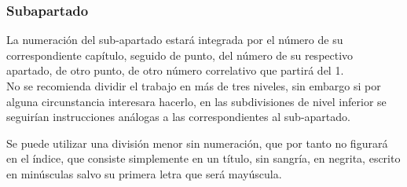 \subsubsection{Subapartado} \label{sec:Subapartado}
La numeración del sub-apartado estará integrada por el número de su correspondiente capítulo, seguido de punto, del número de su respectivo apartado, de otro punto, de otro número correlativo que partirá del 1.\\

No se recomienda dividir el trabajo en más de tres niveles, sin embargo si por alguna circunstancia interesara hacerlo, en las subdivisiones de nivel inferior se seguirían instrucciones análogas a las correspondientes al sub-apartado.

 \label{sec:division menor}

Se puede utilizar una división menor sin numeración, que por tanto no figurará en el índice, que consiste simplemente en un título, sin sangría, en negrita, escrito en minúsculas salvo su primera letra que será mayúscula.

